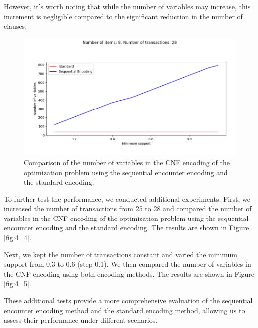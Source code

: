However, it's worth noting that while the number of variables may increase, this increment is negligible compared to the significant reduction in the number of clauses.
\begin{figure}[H]
    \centering
    \includegraphics[width=1\textwidth]{chapter4/image/n_trans_28_vars.png}
    \caption{Comparison of the number of variables in the CNF encoding of the optimization problem using the sequential encounter encoding and the standard encoding.}
    \label{fig:4_3}
\end{figure}

To further test the performance, we conducted additional experiments. First, we increased the number of transactions from 25 to 28 and compared the number of variables in the CNF encoding of the optimization problem using the sequential encounter encoding and the standard encoding. The results are shown in Figure \ref{fig:4_4}.

Next, we kept the number of transactions constant and varied the minimum support from 0.3 to 0.6 (step 0.1). We then compared the number of variables in the CNF encoding using both encoding methods. The results are shown in Figure \ref{fig:4_5}.

These additional tests provide a more comprehensive evaluation of the sequential encounter encoding method and the standard encoding method, allowing us to assess their performance under different scenarios.

